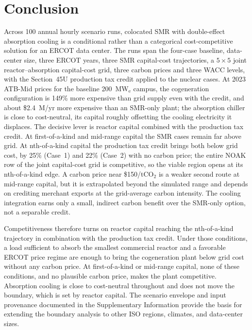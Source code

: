 \documentclass[a4paper,fleqn]{cas-sc}
\begin{document}
\section{Conclusion}
\label{sec:conclusion}

Across 100 annual hourly scenario runs, colocated SMR with double-effect absorption cooling is a conditional rather than a categorical cost-competitive solution for an ERCOT data center. The runs span the four-case baseline, data-center size, three ERCOT years, three SMR capital-cost trajectories, a $5\times5$ joint reactor--absorption capital-cost grid, three carbon prices and three WACC levels, with the Section~45U production tax credit applied to the nuclear cases. At 2023 ATB-Mid prices for the baseline 200~MW$_\mathrm{e}$ campus, the cogeneration configuration is 149\% more expensive than grid supply even with the credit, and about \$2.4~M/yr more expensive than an SMR-only plant; the absorption chiller is close to cost-neutral, its capital roughly offsetting the cooling electricity it displaces. The decisive lever is reactor capital combined with the production tax credit. At first-of-a-kind and mid-range capital the SMR cases remain far above grid. At nth-of-a-kind capital the production tax credit brings both below grid cost, by 25\% (Case~1) and 22\% (Case~2) with no carbon price; the entire NOAK row of the joint capital-cost grid is competitive, so the viable region opens at its nth-of-a-kind edge. A carbon price near \$150/tCO$_2$ is a weaker second route at mid-range capital, but it is extrapolated beyond the simulated range and depends on crediting merchant exports at the grid-average carbon intensity. The cooling integration earns only a small, indirect carbon benefit over the SMR-only option, not a separable credit.

Competitiveness therefore turns on reactor capital reaching the nth-of-a-kind trajectory in combination with the production tax credit. Under those conditions, a load sufficient to absorb the smallest commercial reactor and a favorable ERCOT price regime are enough to bring the cogeneration plant below grid cost without any carbon price. At first-of-a-kind or mid-range capital, none of these conditions, and no plausible carbon price, makes the plant competitive. Absorption cooling is close to cost-neutral throughout and does not move the boundary, which is set by reactor capital. The scenario envelope and input provenance documented in the Supplementary Information provide the basis for extending the boundary analysis to other ISO regions, climates, and data-center sizes.
\end{document}
